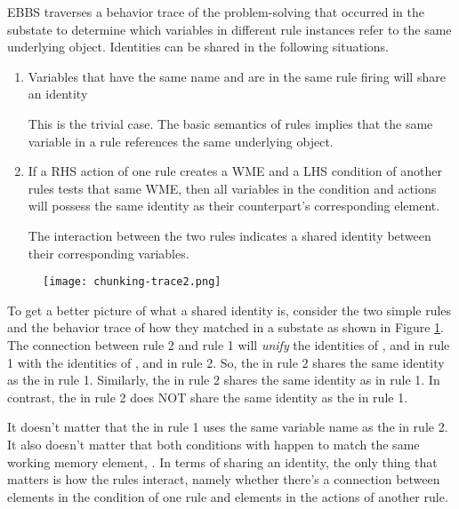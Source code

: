 EBBS traverses a behavior trace of the problem-solving that occurred in the substate to determine which variables in different rule instances refer to the same underlying object. Identities can be shared in the following situations.

\begin{enumerate}
	\item Variables that have the same name and are in the same rule firing will share an identity

	This is the trivial case.  The basic semantics of rules implies that the same variable in a rule references the same underlying object.

	\item If a RHS action of one rule creates a WME and a LHS condition of another rules tests that same WME, then all variables in the condition and actions will possess the same identity as their counterpart's corresponding element.

	The interaction between the two rules indicates a shared identity between their corresponding variables.
\end{enumerate}


\begin{figure}[!ht]
	\centering
	\texttt{[image: chunking-trace2.png]}
	\label{fig:chunking-trace2}
\end{figure}
\vspace{6pt}

To get a better picture of what a shared identity is, consider the two simple rules and the behavior trace of how they matched in a substate as shown in Figure \ref{fig:chunking-trace2}. The connection between rule 2 and rule 1 will \textit{unify} the identities of ,  and  in rule 1 with the identities of ,  and  in rule 2.  So, the  in rule 2 shares the same identity as the  in rule 1.  Similarly, the  in rule 2 shares the same identity as  in rule 1.  In contrast, the  in rule 2 does NOT share the same identity as the  in rule 1.

It doesn't matter that the  in rule 1 uses the same variable name as the  in rule 2.  It also doesn't matter that both conditions with  happen to match the same working memory element, .  In terms of sharing an identity, the only thing that matters is how the rules interact, namely whether there's a connection between elements in the condition of one rule and elements in the actions of another rule.

